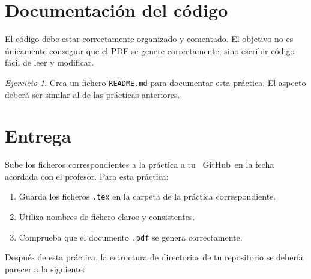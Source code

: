 \documentclass[11pt,a4paper]{article}
\theoremstyle{plain}
\theoremstyle{definition}
\theoremstyle{remark}
\theoremstyle{exercise}
\newtheorem{exercise}{Ejercicio}
\newcommand{\GitHub}{\faIcon{github}~\!GitHub}
\begin{document}

\section{Documentación del código}

El código debe estar correctamente organizado y comentado. El objetivo no es únicamente conseguir que el PDF se genere correctamente, sino escribir código fácil de leer y modificar.


\begin{exercise} Crea un fichero \texttt{README.md} para documentar esta práctica. El aspecto deberá ser similar al de las prácticas anteriores.
\end{exercise}

\section{Entrega}

Sube los ficheros correspondientes a la práctica a tu \GitHub\ en la fecha acordada con el profesor. Para esta práctica:
\begin{enumerate}
    \item Guarda los ficheros \texttt{.tex} en la carpeta de la práctica correspondiente.
    \item Utiliza nombres de fichero claros y consistentes.
    \item Comprueba que el documento \texttt{.pdf} se genera correctamente.
\end{enumerate}
Después de esta práctica, la estructura de directorios de tu repositorio se debería parecer a la siguiente:

\begin{center}
\begin{minipage}{0.75\linewidth}
\end{minipage}
\end{center}
\end{document}
